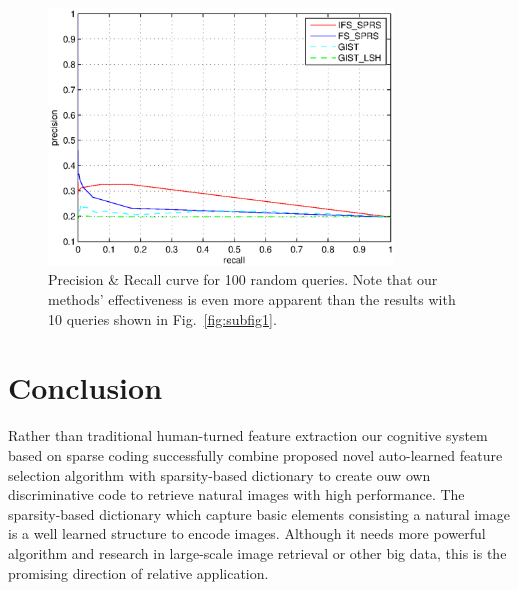 \documentclass[letterpaper]{article}
\begin{document}
\begin{figure}[ht]
	\centering
	\includegraphics[width=3.6in]{figures_dir/round4_random100_4comparison_75.eps}
	\caption{Precision \& Recall curve for 100 random queries. Note that our methods' effectiveness is even more apparent than the results with 10 queries shown in Fig.~\ref{fig:subfig1}.}
	\label{random 100 queries}
	
\end{figure}

\section{Conclusion}
Rather than traditional human-turned feature extraction our cognitive system based on sparse coding successfully combine proposed novel auto-learned feature selection algorithm with sparsity-based dictionary to create ouw own discriminative code to retrieve natural images with high performance. The sparsity-based dictionary which capture basic elements consisting a natural image is a well learned structure to encode images. Although it needs more powerful algorithm and research in large-scale image retrieval or other big data, this is the promising direction of relative application.  


\end{document}
